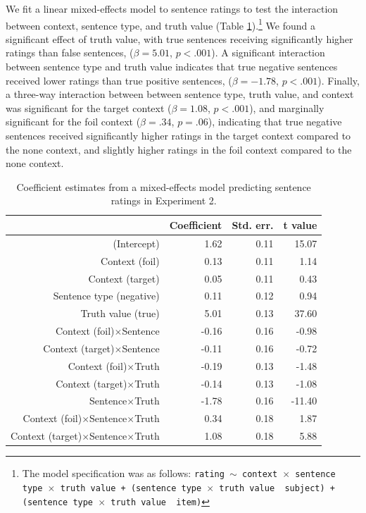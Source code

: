 \documentclass[10pt,letterpaper]{article}
\begin{document}
We fit a linear mixed-effects model to sentence ratings to test the interaction between context, sentence type, and truth value (Table \ref{tab:s2}).\footnote{ The model specification was as follows: \texttt{rating $\sim$ context~$\times$~sentence type~$\times$~truth value + (sentence type~$\times$~truth value~\textbar~subject) +  (sentence type~$\times$~truth value~\textbar~item)}}  We found a significant effect of truth value, with true sentences receiving significantly higher ratings than false sentences, ($\beta= 5.01$, $p< .001$).  A significant interaction between sentence type and truth value indicates that true negative sentences received lower ratings than true positive sentences, ($\beta= -1.78$, $p< .001$).  Finally, a three-way interaction between between sentence type, truth value, and context was significant for the target context ($\beta= 1.08$, $p< .001$), and marginally significant for the foil context ($\beta= .34$, $p=.06$), indicating that true negative sentences received significantly higher ratings in the target context compared to the none context, and slightly higher ratings in the foil context compared to the none context.  

\begin{table}[t]
\caption{\label{tab:s2} Coefficient estimates from a mixed-effects model predicting sentence ratings in Experiment 2.}
\begin{center}
\small\addtolength{\tabcolsep}{-5pt}
\begin{tabular}{rrrr}
  \hline
 & Coefficient & Std. err. & t value \\ 
  \hline
(Intercept) & 1.62 & 0.11 & 15.07 \\ 
  Context (foil) & 0.13 & 0.11 & 1.14  \\ 
  Context (target) & 0.05 & 0.11 & 0.43  \\ 
  Sentence type (negative) & 0.11 & 0.12 & 0.94 \\
  Truth value (true) & 5.01 & 0.13 & 37.60 \\ 
  Context (foil)$\times$Sentence & -0.16 & 0.16 & -0.98 \\
  Context (target)$\times$Sentence & -0.11 & 0.16 & -0.72 \\
  Context (foil)$\times$Truth & -0.19 & 0.13 & -1.48 \\
  Context (target)$\times$Truth & -0.14 & 0.13 & -1.08 \\
  Sentence$\times$Truth & -1.78 & 0.16 & -11.40 \\
  Context (foil)$\times$Sentence$\times$Truth& 0.34 & 0.18 & 1.87 \\
  Context (target)$\times$Sentence$\times$Truth & 1.08 & 0.18 & 5.88 \\
   \hline
\end{tabular}
\end{center}
\end{table}
\end{document}
